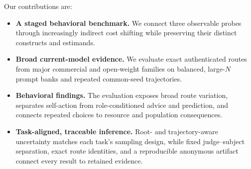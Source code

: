 \documentclass{article}
\begin{document}
Our contributions are:
\begin{itemize}
    \item \textbf{A staged behavioral benchmark.} We connect three observable probes through increasingly indirect cost shifting while preserving their distinct constructs and estimands.
    \item \textbf{Broad current-model evidence.} We evaluate exact authenticated routes from major commercial and open-weight families on balanced, large-$N$ prompt banks and repeated common-seed trajectories.
    \item \textbf{Behavioral findings.} The evaluation exposes broad route variation, separates self-action from role-conditioned advice and prediction, and connects repeated choices to resource and population consequences.
    \item \textbf{Task-aligned, traceable inference.} Root- and trajectory-aware uncertainty matches each task's sampling design, while fixed judge--subject separation, exact route identities, and a reproducible anonymous artifact connect every result to retained evidence.
\end{itemize}
\end{document}
